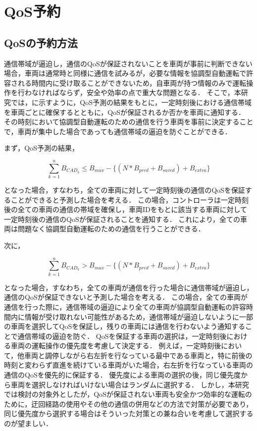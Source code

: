\documentclass[a4paper,11pt,uplatex]{ujreport}
\begin{document}
\section{QoS予約}
\label{sec:QoS予約}

\subsection{QoSの予約方法}

通信帯域が逼迫し，通信のQoSが保証されないことを車両が事前に判断できない場合，車両は通常時と同様に通信を試みるが，必要な情報を協調型自動運転で許容される時間内に受け取ることができないため，自車両が持つ情報のみで運転操作を行わなければならず，安全や効率の点で重大な問題となる．
そこで，本研究では，に示すように，QoS予測の結果をもとに，一定時刻後における通信帯域を車両ごとに確保するとともに，QoSが保証されるか否かを車両に通知する．
その時刻において協調型自動運転のための通信を行う車両を事前に決定することで，車両が集中した場合であっても通信帯域の逼迫を防ぐことができる．\par
まず，QoS予測の結果，

\begin{equation}
\sum_{k=1}^{n} B_{CAD_k} \leq B_{max} - \{(N * B_{pred} + B_{saved}) + B_{extra}\}
\end{equation}

となった場合，すなわち，全ての車両に対して一定時刻後の通信のQoSを保証することができると予測した場合を考える．
この場合，コントローラは一定時刻後の全ての車両の通信の帯域を確保し，車両IDをもとに該当する車両に対して一定時刻後の通信のQoSが保証されることを通知する．
これにより，全ての車両は問題なく協調型自動運転のための通信を行うことができる．\par
次に，

\begin{equation}
\sum_{k=1}^{n} B_{CAD_k} > B_{max} - \{(N * B_{pred} + B_{saved}) + B_{extra}\}
\end{equation}

となった場合，すなわち，全ての車両が通信を行った場合に通信帯域が逼迫し，通信のQoSが保証できないと予測した場合を考える．
この場合，全ての車両が通信を行った際に，通信帯域の逼迫により全ての車両が協調型自動運転の許容時間内に情報が受け取れない可能性があるため，通信帯域が逼迫しないように一部の車両を選択してQoSを保証し，残りの車両には通信を行わないよう通知することで通信帯域の逼迫を防ぐ．
QoSを保証する車両の選択は，一定時刻後における車両の運転操作の優先度を考慮して決定する．
例えば，一定時刻後において，他車両と調停しながら右左折を行なっている最中である車両と，特に前後の時刻と変わらず直進を続けている車両がいた場合，右左折を行なっている車両の通信のQoSを優先的に保証する．
優先度による車両の選択の後，同じ優先度から車両を選択しなければいけない場合はランダムに選択する．
しかし，本研究では検討の対象外としたが，QoSが保証されない車両も安全かつ効率的な運転のために，迂回経路の使用やその他の通信の併用などの方法で対策が必要であり，同じ優先度から選択する場合はそういった対策との兼ね合いを考慮して選択するのが望ましい．
\end{document}
